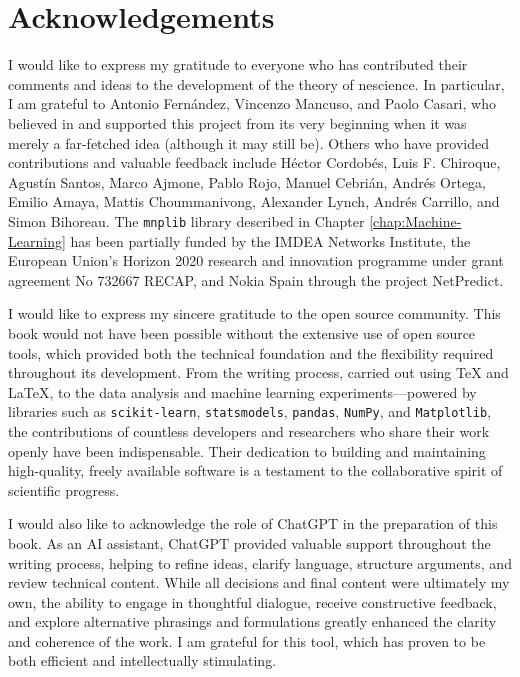 %
%

\section*{Acknowledgements}

I would like to express my gratitude to everyone who has contributed their comments and ideas to the development of the theory of nescience. In particular, I am grateful to Antonio Fernández, Vincenzo Mancuso, and Paolo Casari, who believed in and supported this project from its very beginning when it was merely a far-fetched idea (although it may still be). Others who have provided contributions and valuable feedback include Héctor Cordobés, Luis F. Chiroque, Agustín Santos, Marco Ajmone, Pablo Rojo, Manuel Cebrián, Andrés Ortega, Emilio Amaya, Mattis Choummanivong, Alexander Lynch, Andrés Carrillo, and Simon Bihoreau. The \texttt{mnplib} library described in Chapter \ref{chap:Machine-Learning} has been partially funded by the IMDEA Networks Institute, the European Union's Horizon 2020 research and innovation programme under grant agreement No 732667 RECAP, and Nokia Spain through the project NetPredict.

I would like to express my sincere gratitude to the open source community. This book would not have been possible without the extensive use of open source tools, which provided both the technical foundation and the flexibility required throughout its development. From the writing process, carried out using \TeX{} and \LaTeX{}, to the data analysis and machine learning experiments—powered by libraries such as \texttt{scikit-learn}, \texttt{statsmodels}, \texttt{pandas}, \texttt{NumPy}, and \texttt{Matplotlib}, the contributions of countless developers and researchers who share their work openly have been indispensable. Their dedication to building and maintaining high-quality, freely available software is a testament to the collaborative spirit of scientific progress.

I would also like to acknowledge the role of ChatGPT in the preparation of this book. As an AI assistant, ChatGPT provided valuable support throughout the writing process, helping to refine ideas, clarify language, structure arguments, and review technical content. While all decisions and final content were ultimately my own, the ability to engage in thoughtful dialogue, receive constructive feedback, and explore alternative phrasings and formulations greatly enhanced the clarity and coherence of the work. I am grateful for this tool, which has proven to be both efficient and intellectually stimulating.

